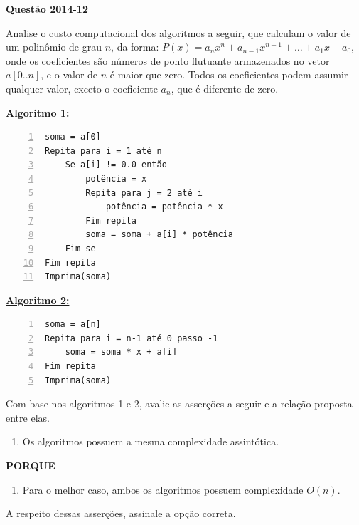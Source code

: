 \documentclass[12pt,a4paper]{article}
\newenvironment{question}[1]{%
    \pdfbookmark[3]{Questão #1}{q:#1}
    \label{q:#1}
    \bigskip\par\noindent
    \textbf{Questão #1} \dotfill
    \medskip\par\nopagebreak\noindent
    \ignorespaces
}{%
    \noindent\dotfill\medskip
}
\newcommand{\listtitle}[1]{%
    \medskip\par\noindent
    {\small\textbf{\underline{#1:}}}%
    \par\nopagebreak\noindent
}
\begin{document}
\begin{question}{2014-12}
Analise o custo computacional dos algoritmos a seguir, que calculam o valor de um polinômio de grau $n$, da forma:
$P(x) = a_nx^n + a_{n-1}x^{n-1} + \dots + a_1 x + a_0$,
onde os coeficientes são números de ponto flutuante armazenados no vetor $a[0..n]$, e o valor de $n$ é maior que zero.
Todos os coeficientes podem assumir qualquer valor, exceto o coeficiente $a_n$, que é diferente de zero.

\medskip\noindent\begin{minipage}{\linewidth}
\listtitle{Algoritmo 1}
\begin{Verbatim}[numbers=left]
soma = a[0]
Repita para i = 1 até n
    Se a[i] != 0.0 então
        potência = x
        Repita para j = 2 até i
            potência = potência * x
        Fim repita
        soma = soma + a[i] * potência
    Fim se
Fim repita
Imprima(soma)
\end{Verbatim}

\listtitle{Algoritmo 2}
\begin{Verbatim}[numbers=left]
soma = a[n]
Repita para i = n-1 até 0 passo -1
    soma = soma * x + a[i]
Fim repita
Imprima(soma)
\end{Verbatim}
\medskip
\end{minipage}

\noindent
Com base nos algoritmos 1 e 2, avalie as asserções a seguir e a relação proposta entre elas.

\begin{enumerate}[label=\Roman*.]
    \item Os algoritmos possuem a mesma complexidade assintótica.
\end{enumerate}

\begin{center}
    \textbf{PORQUE}
\end{center}

\begin{enumerate}[label=\Roman*., start=2]
    \item Para o melhor caso, ambos os algoritmos possuem complexidade $O(n)$.
\end{enumerate}

\noindent
A respeito dessas asserções, assinale a opção correta.


\end{question}
\end{document}
